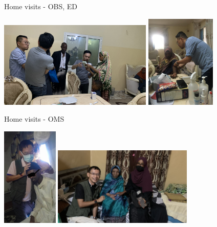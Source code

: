\documentclass[aspectratio=169]{beamer}
\begin{document}
\begin{frame}{Home visits - OBS, ED}
    \begin{center}
        \includegraphics[width=0.55\textwidth]{IMG-5075.jpg}
        \includegraphics[width=0.25\textwidth]{386eb640-9657-4b71-af5c-5de19cb7b159.JPG}
    \end{center}
\end{frame}


\begin{frame}{Home visits - OMS}
    \begin{center}
        \includegraphics[width=0.20\textwidth]{399223ed-f871-41f7-ae57-c90a5f0ee459.jpeg}
        \includegraphics[width=0.50\textwidth]{IMG-3330.jpg}
    \end{center}
\end{frame}
\end{document}
